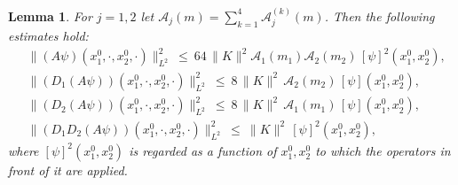 \documentclass[b5paper,draft,openbib,12pt]{memoir}
\newtheorem{Lemma}[Def]{Lemma}
\begin{document}
\begin{Lemma} \label{thm:spatialnormestimates}
	For $j=1,2$ let $\mathcal{A}_j(m) = \sum_{k=1}^4 \mathcal{A}_j^{(k)}(m)$. Then the following estimates hold:
\begin{align}
		& \!\| (A \psi)(x_1^0,\cdot,x_2^0,\cdot)\|^2_{L^2} ~\leq ~64 \, \|K\|^2 \mathcal{A}_1(m_1) \mathcal{A}_2(m_2) \, [\psi]^2(x_1^0,x_2^0),
	\label{eq:apsiestimate}\\
		&\! \| (D_1(A \psi))(x_1^0,\cdot,x_2^0,\cdot) \|^2_{L^2}~\leq~8 \, \| K \|^2 \, \mathcal{A}_2(m_2) \, [\psi](x_1^0,x_2^0),
	\label{eq:d1apsiestimate}\\
		&\! \| (D_2(A \psi))(x_1^0,\cdot,x_2^0,\cdot) \|^2_{L^2} ~\leq~8 \, \| K \|^2 \, \mathcal{A}_1(m_1) \, [\psi](x_1^0,x_2^0),
	\label{eq:d2apsiestimate}\\
		&\! \| (D_1 D_2(A \psi))(x_1^0,\cdot,x_2^0,\cdot) \|^2_{L^2} ~\leq~ \| K \|^2 \, [\psi]^2(x_1^0,x_2^0),
	\label{eq:d1d2apsiestimate}
	\end{align}
	where $[\psi]^2(x_1^0,x_2^0)$ is regarded as a function of $x_1^0,x_2^0$ to which the operators in front of it are applied.
\end{Lemma}
\end{document}
